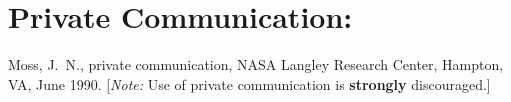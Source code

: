 \documentclass{article}
\begin{document}
\section{Private Communication:}
  \cite{moss:90pc}Moss, J.~N., private
  communication, NASA Langley Research Center, Hampton, VA, June
  1990. [{\itshape Note:} Use of private communication is
  {\bfseries strongly} discouraged.]

\newpage%



\end{document}
